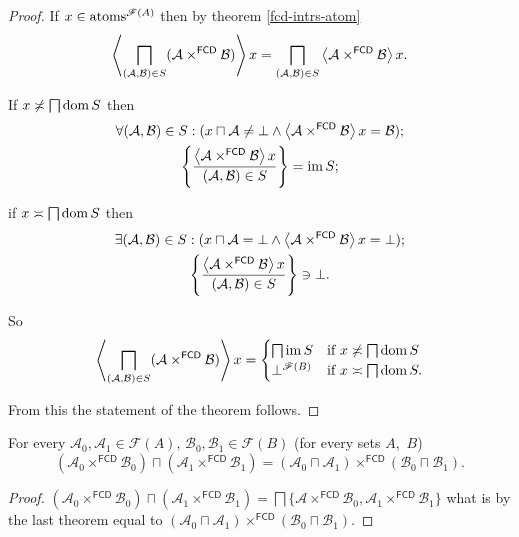 \begin{proof}
If $x\in\operatorname{atoms}^{\mathscr{F}(A)}$ then by theorem \ref{fcd-intrs-atom}
\[
\left\langle \bigsqcap_{(\mathcal{A},\mathcal{B})\in
S}(\mathcal{A}\times^{\mathsf{FCD}}\mathcal{B})\right\rangle x=\bigsqcap_{(\mathcal{A}
,\mathcal{B})\in S}\left\langle \mathcal{A}\times^{\mathsf{FCD}}\mathcal{B}\right\rangle x.
\]


If $x\not\asymp\bigsqcap\operatorname{dom} S$ then
\begin{gather*}
\forall(\mathcal{A},\mathcal{B})\in
S:(x\sqcap\mathcal{A}\ne\bot\land\left\langle \mathcal{A}\times^{
\mathsf{FCD}}\mathcal{B}\right\rangle x=\mathcal{B});\\
\left\{ \frac{\left\langle \mathcal{A}\times^{\mathsf{FCD}}\mathcal{B}\right\rangle x}{(\mathcal{A}
,\mathcal{B})\in S}\right\}=\operatorname{im} S;
\end{gather*}


if $x\asymp\bigsqcap\operatorname{dom} S$ then
\begin{gather*}
\exists(\mathcal{A},\mathcal{B})\in
S:(x\sqcap\mathcal{A}=\bot\land\left\langle \mathcal{A}\times^{
\mathsf{FCD}}\mathcal{B}\right\rangle x=\bot);\\
\left\{ \frac{\left\langle \mathcal{A}\times^{\mathsf{FCD}}\mathcal{B}\right\rangle x}{(\mathcal{A}
,\mathcal{B})\in S}\right\}\ni\bot.
\end{gather*}


So
\[
\left\langle \bigsqcap_{(\mathcal{A},\mathcal{B})\in
S}(\mathcal{A}\times^{\mathsf{FCD}}\mathcal{B})\right\rangle x=\begin{cases}
\bigsqcap\operatorname{im} S & \text{if }x\not\asymp\bigsqcap\operatorname{dom} S\\
\bot^{\mathscr{F}(B)} & \text{if }x\asymp\bigsqcap\operatorname{dom} S.
\end{cases}
\]


From this the statement of the theorem follows.\end{proof}
\begin{cor}
For every $\mathcal{A}_{0},\mathcal{A}_{1}\in\mathscr{F}(A)$,
$\mathcal{B}_{0},\mathcal{B}_{1}\in\mathscr{F}(B)$
(for every sets $A$,~$B$)
\[
(\mathcal{A}_{0}\times^{\mathsf{FCD}}\mathcal{B}_{0})\sqcap(\mathcal{A}_{1}
\times^{\mathsf{FCD}}\mathcal{B}_{1})=(\mathcal{A}_{0}\sqcap\mathcal{A}_{1}
)\times^{\mathsf{FCD}}(\mathcal{B}_{0}\sqcap\mathcal{B}_{1}).
\]
\end{cor}
\begin{proof}
$(\mathcal{A}_{0}\times^{\mathsf{FCD}}\mathcal{B}_{0})\sqcap(\mathcal{A}_{1}
\times^{\mathsf{FCD}}\mathcal{B}_{1})=\bigsqcap\{\mathcal{A}\times^{\mathsf{FCD
}}\mathcal{B}_{0},\mathcal{A}_{1}\times^{\mathsf{FCD}}\mathcal{B}_{1}\}$
what is by the last theorem equal to
$(\mathcal{A}_{0}\sqcap\mathcal{A}_{1})\times^{\mathsf{FCD}}(\mathcal{B}_{0}
\sqcap\mathcal{B}_{1})$.\end{proof}
